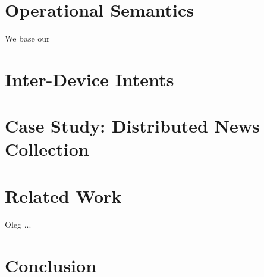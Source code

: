 \documentclass{acm_proc_article-sp}
\begin{document}
\section{Operational Semantics}

We base our

\section{Inter-Device Intents}

\section{Case Study: Distributed News Collection}

\section{Related Work}
Oleg \cite{kiselyov:2006} ...

\section{Conclusion}

{}

\end{document}
